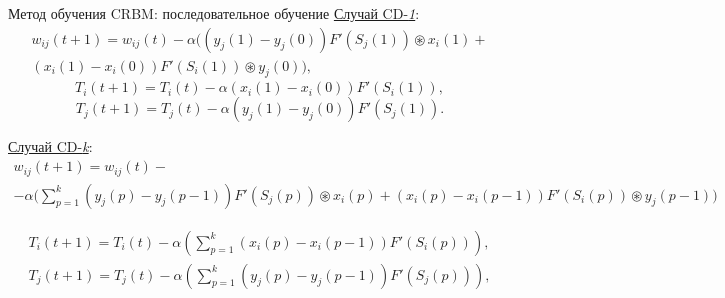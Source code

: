 \documentclass[10pt]{beamer}
\begin{document}
        \begin{frame}{Метод обучения CRBM: последовательное обучение}
            \underline{Случай CD-\textit{1}}:
            \begin{multline*}
                w_{ij}(t+1)=w_{ij}(t)-\alpha((y_j(1)-y_j(0))F'(S_j(1))\circledast x_i(1)+\\(x_i(1)-x_i(0))F'(S_i(1))\circledast y_j(0)),    
            \end{multline*}
            \begin{equation*}
                T_i(t+1)=T_i(t)-\alpha(x_i(1)-x_i(0))F'(S_i(1)),
            \end{equation*}
            \begin{equation*}
                T_j(t+1)=T_j(t)-\alpha(y_j(1)-y_j(0))F'(S_j(1)).  
            \end{equation*}

            \underline{Случай CD-\textit{k}}:
            \begin{multline*}
                w_{ij}(t+1)=w_{ij}(t)-\\-\alpha\Bigg(\sum_{p=1}^k (y_j(p)-y_j(p-1))F'(S_j(p)) \circledast x_i(p) +(x_i(p)-x_i(p-1))F'(S_i(p)) \circledast y_j(p-1)\Bigg)
            \end{multline*}

            \begin{equation*}
            \begin{aligned}
                T_i(t+1)=T_i(t)-\alpha\left(\sum_{p=1}^k (x_i(p)-x_i(p-1))F'(S_i(p))\right),\\
                T_j(t+1)=T_j(t)-\alpha\left(\sum_{p=1}^k (y_j(p)-y_j(p-1))F'(S_j(p))\right),
            \end{aligned}
            \end{equation*}
        \end{frame}

            
\end{document}
